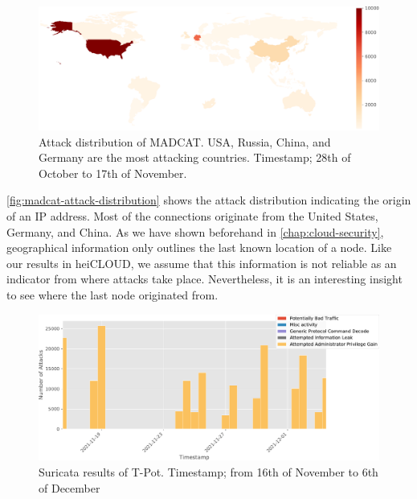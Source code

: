 \begin{figure}[ht]
    \centering
    \includegraphics[width=\textwidth]{figures/madcat-overview-map.pdf}
    \caption[Attack distribution of MADCAT]{
        Attack distribution of MADCAT.
        USA, Russia, China, and Germany are the most attacking countries.
        Timestamp; 28th of October to 17th of November.
    }
    \label{fig:madcat-attack-distribution}
\end{figure}

\autoref{fig:madcat-attack-distribution} shows the attack distribution indicating the origin of an IP address.
Most of the connections originate from the United States, Germany, and China.
As we have shown beforehand in \autoref{chap:cloud-security}, geographical information only outlines the last known location of a node.
Like our results in heiCLOUD, we assume that this information is not reliable as an indicator from where attacks take place.
Nevertheless, it is an interesting insight to see where the last node originated from.

\begin{figure}[ht]
    \centering
    \includegraphics[width=\textwidth]{figures/madcat-suricata-alerts.pdf}
    \caption[Suricata results of T-Pot]{
        Suricata results of T-Pot.
        Timestamp; from 16th of November to 6th of December
    }
    \label{fig:suricata-distribution}
\end{figure}

